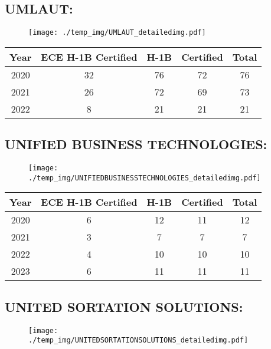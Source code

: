 \documentclass{article}%
\begin{document}
%
\newpage%
\subsection{UMLAUT:}%
\label{subsec:UMLAUT}%
\label{UMLAUTdetailed}%


\begin{figure}[htbp]%
\centering%
\texttt{[image: ./temp\_img/UMLAUT\_detailedimg.pdf]}%
\end{figure}

%
\begin{longtable}{c|c|c|c|c}%
\hline%
Year&ECE H{-}1B Certified&H{-}1B&Certified&Total\\%
\hline%
2020&32&76&72&76\\%
\hline%
2021&26&72&69&73\\%
\hline%
2022&8&21&21&21\\%
\hline%
\end{longtable}

%
\newpage%
\subsection{UNIFIED BUSINESS TECHNOLOGIES:}%
\label{subsec:UNIFIEDBUSINESSTECHNOLOGIES}%
\label{UNIFIEDBUSINESSTECHNOLOGIESdetailed}%


\begin{figure}[htbp]%
\centering%
\texttt{[image: ./temp\_img/UNIFIEDBUSINESSTECHNOLOGIES\_detailedimg.pdf]}%
\end{figure}

%
\begin{longtable}{c|c|c|c|c}%
\hline%
Year&ECE H{-}1B Certified&H{-}1B&Certified&Total\\%
\hline%
2020&6&12&11&12\\%
\hline%
2021&3&7&7&7\\%
\hline%
2022&4&10&10&10\\%
\hline%
2023&6&11&11&11\\%
\hline%
\end{longtable}

%
\newpage%
\subsection{UNITED SORTATION SOLUTIONS:}%
\label{subsec:UNITEDSORTATIONSOLUTIONS}%
\label{UNITEDSORTATIONSOLUTIONSdetailed}%


\begin{figure}[htbp]%
\centering%
\texttt{[image: ./temp\_img/UNITEDSORTATIONSOLUTIONS\_detailedimg.pdf]}%
\end{figure}
\end{document}
